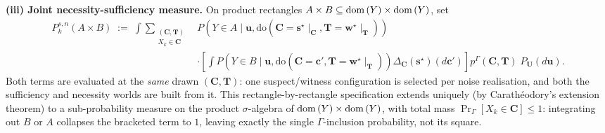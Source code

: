 \begin{definition}
\textbf{(iii) Joint necessity-sufficiency measure.} On product rectangles
$A\times B\subseteq\operatorname{dom}\,(Y)\times\operatorname{dom}\,(Y)$, set
\begin{align}
P_k^{s,n}(A\times B)
\;:=\;
\int
\sum_{\substack{(\mathbf{C},\mathbf{T})\\X_k\in\mathbf{C}}}
&P\!\left(Y\in A \mid \mathbf{u},
\mathrm{do}\!\left(\mathbf{C}=\mathbf{s}^\star\!\mid_{\mathbf{C}},
\mathbf{T}=\mathbf{w}^\star\!\mid_{\mathbf{T}}\right)\right)
\nonumber\\
&\cdot\left[\int
P\!\left(Y\in B \mid \mathbf{u},
\mathrm{do}\!\left(\mathbf{C}=\mathbf{c}',\mathbf{T}=\mathbf{w}^\star\!\mid_{\mathbf{T}}\right)\right)
\Delta_{\mathbf{C}}(\mathbf{s}^\star)(d\mathbf{c}')\right]
p^\Gamma(\mathbf{C},\mathbf{T})
\;P_{\mathbf{U}}(d\mathbf{u}).
\end{align}
Both terms are evaluated at the \emph{same} drawn $(\mathbf{C},\mathbf{T})$: one
suspect/witness configuration is selected per noise realisation, and both the
sufficiency and necessity worlds are built from it. This rectangle-by-rectangle
specification extends uniquely (by Carath\'eodory's extension theorem) to a
sub-probability measure on the product $\sigma$-algebra of
$\operatorname{dom}\,(Y)\times\operatorname{dom}\,(Y)$, with total mass $\Pr_\Gamma[X_k\in\mathbf{C}] \leq 1$:
integrating out $B$ or $A$ collapses the bracketed term to $1$, leaving exactly
the single $\Gamma$-inclusion probability, not its square.
\end{definition}

